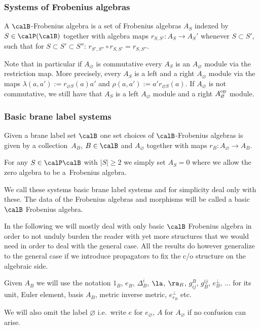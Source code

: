 \subsubsection{Systems of Frobenius algebras}
\begin{df} A $\calB$-Frobenius algebra is a set of Frobenius
algebras $A_S$ indexed by $S\in \calP(\calB)$ together with algebra maps
$r_{S,S'}:A_S\to A_S'$ whenever $S\subset S'$,
such that for $S\subset S'\subset S''$: $r_{S',S''}\circ r_{S,S'}=r_{S,S''}$.
\end{df}



Note that in particular if $A_{\varnothing}$ is commutative
every $A_S$ is an $A_{\varnothing}$ module via
the restriction map. More precisely,  every $A_S$ is a left and a right $A_{\varnothing}$
module via the maps $\lambda (a,a'):= r_{\varnothing S}(a)a'$
and $\rho(a,a') :=a' r_{\varnothing S}(a)$. If $A_{\varnothing}$ is not commutative,
we still have that $A_S$ is a left $A_{\varnothing}$ module and a right $A_{\varnothing}^{\rm op}$ module.


\subsubsection{Basic brane label systems}
Given a  brane label set $\calB$ one set choices of $\calB$-Frobenius algebras is given by
a collection~$A_B$, $B\in \calB$ and $A_{\varnothing}$ together with maps $r_B:A_{\varnothing}\to A_B$.

For any $S\in \calP\calB$ with $|S|\geq 2$ we simply set $A_S=0$ where
we allow the zero algebra to be a~Frobenius algebra.

We call these systems basic brane label systems and for simplicity deal only with these.
The data of the Frobenius algebras and morphisms will be called a basic $\calB$ Frobenius algebra.

\begin{rmk}
In the following we will mostly deal with only basic $\calB$ Frobenius algebra in order to not unduly
burden the  reader with yet more  structures that we would need in order to deal with the general case.
All the results do however generalize to the general case if we introduce propagators to f\/ix the
c/o structure on the algebraic side.
\end{rmk}

\begin{nota}
Given $A_B$ we will use the notation
$1_B$, $e_B$, $\Delta^i_B$, $\la$, $\ra_B$, $g^B_{ij}$, $g^{ij}_B$, $e^{\perp}_B$,
$\dots$ for its unit, Euler element,
basis $A_B$, metric inverse metric, $e^{\perp}_{r_B}$ etc.

We will also omit the label ${\varnothing}$ i.e.\ write  $e$ for $e_{\varnothing}$, $A$ for $A_{\varnothing}$ if no
confusion can arise.
\end{nota}



